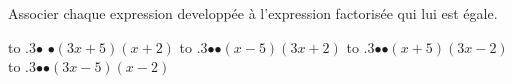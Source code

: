 \documentclass[exercice]{thedocument}%
\begin{document}
%
Associer chaque expression developpée à l'expression factorisée qui lui est
égale.\par{}\baselineskip
\leavevmode\hbox to .3\linewidth{\hfill$3x^2-11x+10$}\kern5pt$\bullet$%
\kern50pt$\bullet$\kern5pt\hbox{$(3x+5)(x+2)$\hfill}\vskip5pt
\leavevmode\hbox to .3\linewidth{\hfill$3x^2-13x-10$}\kern5pt$\bullet$\kern50pt$\bullet$\kern5pt\hbox{$(x-5)(3x+2)$\hfill}\vskip5pt
\leavevmode\hbox to .3\linewidth{\hfill$3x^2+13x-10$}\kern5pt$\bullet$\kern50pt$\bullet$\kern5pt\hbox{$(x+5)(3x-2)$\hfill}\vskip5pt
\leavevmode\hbox to .3\linewidth{\hfill$3x^2+11x+10$}\kern5pt$\bullet$\kern50pt$\bullet$\kern5pt\hbox{$(3x-5)(x-2)$\hfill}\par
\end{document}
